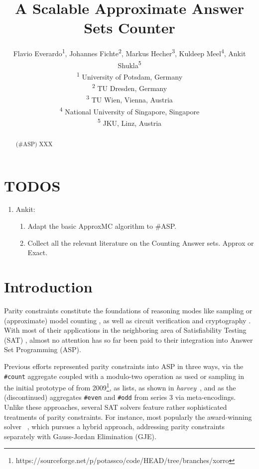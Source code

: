 \documentclass[letterpaper]{article} %
\title{A Scalable Approximate Answer Sets Counter}
\author{Flavio Everardo\textsuperscript{\rm 1}, Johannes Fichte\textsuperscript{\rm 2}, Markus Hecher\textsuperscript{\rm 3}, Kuldeep Meel\textsuperscript{\rm 4}, Ankit Shukla\textsuperscript{\rm 5} \\ %
\textsuperscript{\rm 1} University of Potsdam, Germany\\ 
\textsuperscript{\rm 2} TU Dresden, Germany\\ 
\textsuperscript{\rm 3}  TU Wien, Vienna, Austria \\ \textsuperscript{\rm 4} National University of Singapore, Singapore \\ \textsuperscript{\rm 5} JKU, Linz, Austria
}
\def\approxmc{\textsf{ApproxMC}\xspace}
\def\asp{\textsf{\#ASP}\xspace}
\begin{document}
\maketitle

\begin{abstract}
(\asp) XXX
\end{abstract}

\section{TODOS} \label{sec:todos}
\begin{enumerate}
	\item Ankit: 
	    \begin{enumerate}
	    	\item Adapt the basic \approxmc algorithm to \asp.
	    	\item Collect all the relevant literature on the Counting Answer sets. Approx or Exact. 
	    \end{enumerate}
\end{enumerate}

\section{Introduction} \label{sec:introduction}
 Parity constraints constitute the foundations of reasoning modes like sampling or (approximate) model counting \cite{DBLP:journals/corr/abs-1806-02239}, as well as circuit verification and cryptography \cite{DBLP:conf/laitinen2014extending}.
 With most of their applications in the neighboring area of Satisfiability Testing (SAT) \cite{DBLP:journals/corr/abs-1806-02239},
 almost no attention has so far been paid to their integration into Answer Set Programming (ASP).%
 
 Previous efforts represented parity constraints into ASP in three ways,
 via the \texttt{\#count} aggregate coupled with a modulo-two operation as used or sampling in the initial prototype of \xorro{} from 2009\footnote{https://sourceforge.net/p/potassco/code/HEAD/tree/branches/xorro},
 as lists, as shown in \emph{harvey}~\cite{DBLP:conf/lpnmr/GresslerOT17},
 and as the (discontinued) aggregates \texttt{\#even} and \texttt{\#odd} from \gringo{} series 3 via meta-encodings.
 Unlike these approaches, several SAT solvers feature rather sophisticated treatments of parity constraints.
 For instance, most popularly the award-winning solver \cryptominisat~\cite{DBLP:conf/sat/SoosNC09}, which pursues a hybrid approach,
 addressing parity constraints separately with Gauss-Jordan Elimination (GJE).
 
\end{document}
